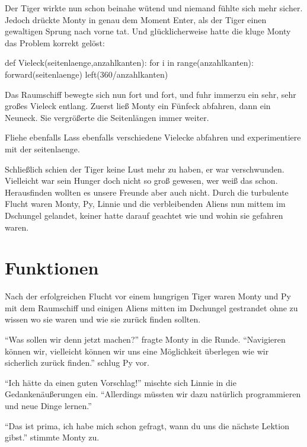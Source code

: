 \documentclass[a5paper,12pt,twoside,openright]{scrbook}
\begin{document}
   
Der Tiger wirkte nun schon beinahe wütend und niemand fühlte sich mehr sicher.   
Jedoch drückte Monty in genau dem Moment Enter, als der Tiger einen gewaltigen Sprung nach vorne tat.
Und glücklicherweise hatte die kluge Monty das Problem korrekt gelöst:

\begin{pythoncode}
def Vieleck(seitenlaenge,anzahlkanten):
    for i in range(anzahlkanten):
        forward(seitenlaenge)
        left(360/anzahlkanten)
\end{pythoncode}

Das Raumschiff bewegte sich nun fort und fort, und fuhr immerzu ein sehr, sehr großes Vieleck entlang.
Zuerst ließ Monty ein Fünfeck abfahren, dann ein Neuneck.
Sie vergrößerte die Seitenlängen immer weiter.

\begin{aufgabe}{Fliehe ebenfalls}
 Lass ebenfalls verschiedene Vielecke abfahren und experimentiere mit der seitenlaenge.
\end{aufgabe}

Schlie{\ss}lich schien der Tiger keine Lust mehr zu haben, er war verschwunden.
Vielleicht war sein Hunger doch nicht so gro{\ss} gewesen, wer wei{\ss} das schon.
Herausfinden wollten es unsere Freunde aber auch nicht.
Durch die turbulente Flucht waren Monty, Py, Linnie und die verbleibenden Aliens nun mittem im Dschungel gelandet, 
keiner hatte darauf geachtet wie und wohin sie gefahren waren.
   
\chapter{Funktionen}   

Nach der erfolgreichen Flucht vor einem hungrigen Tiger 
waren Monty und Py mit dem Raumschiff und einigen Aliens mitten im Dschungel gestrandet 
ohne zu wissen wo sie waren und wie sie zurück finden sollten.

``Was sollen wir denn jetzt machen?'' fragte Monty in die Runde.
``Navigieren können wir, vielleicht können wir uns eine Möglichkeit überlegen 
wie wir sicherlich zurück finden.'' schlug Py vor.

``Ich hätte da einen guten Vorschlag!'' mischte sich Linnie in die Gedankenäußerungen ein.
``Allerdings müssten wir dazu natürlich programmieren und neue Dinge lernen.''

``Das ist prima, ich habe mich schon gefragt, wann du uns die nächste Lektion gibst.'' stimmte Monty zu.
\end{document}
